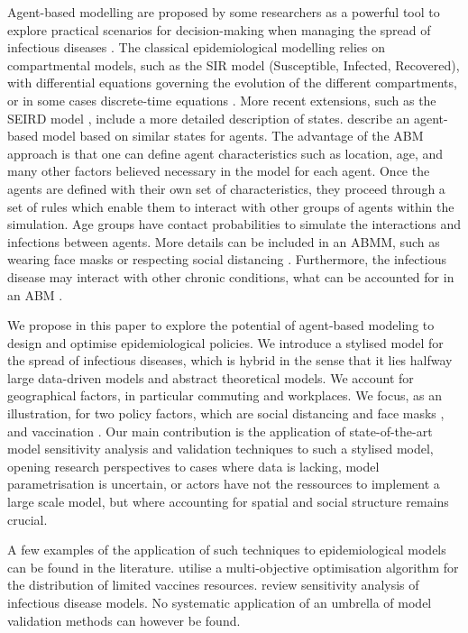 \documentclass[smallextended]{svjour3}       %
\begin{document}
Agent-based modelling are proposed by some researchers as a powerful tool to explore practical scenarios for decision-making when managing the spread of infectious diseases \cite{miksch2019should}. The classical epidemiological modelling relies on compartmental models, such as the SIR model (Susceptible, Infected, Recovered), with differential equations governing the evolution of the different compartments, or in some cases discrete-time equations \cite{ramani2004oscillating}. More recent extensions, such as the SEIRD model \cite{chowell2008seasonal}, include a more detailed description of states. \cite{chumachenko2018agent} describe an agent-based model based on similar states for agents. The advantage of the ABM approach is that one can define agent characteristics such as location, age, and many other factors believed necessary in the model for each agent. Once the agents are defined with their own set of characteristics, they proceed through a set of rules which enable them to interact with other groups of agents within the simulation. Age groups have contact probabilities to simulate the interactions and infections between agents. More details can be included in an ABMM, such as wearing face masks or respecting social distancing \cite{minoza2021covid}. Furthermore, the infectious disease may interact with other chronic conditions, what can be accounted for in an ABM \cite{fekadu2021impact}.


We propose in this paper to explore the potential of agent-based modeling to design and optimise epidemiological policies. We introduce a stylised model for the spread of infectious diseases, which is hybrid in the sense that it lies halfway large data-driven models and abstract theoretical models. We account for geographical factors, in particular commuting and workplaces. We focus, as an illustration, for two policy factors, which are social distancing and face masks \cite{kwon2021association}, and vaccination \cite{bicher2022model}. Our main contribution is the application of state-of-the-art model sensitivity analysis and validation techniques \cite{raimbault2019methods} to such a stylised model, opening research perspectives to cases where data is lacking, model parametrisation is uncertain, or actors have not the ressources to implement a large scale model, but where accounting for spatial and social structure remains crucial.

A few examples of the application of such techniques to epidemiological models can be found in the literature. \cite{baquela2022optimising} utilise a multi-objective optimisation algorithm for the distribution of limited vaccines resources. \cite{wu2013sensitivity} review sensitivity analysis of infectious disease models. No systematic application of an umbrella of model validation methods can however be found.
\end{document}
